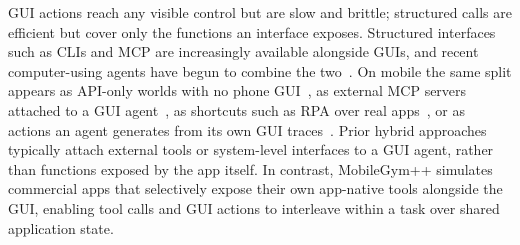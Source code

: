 GUI actions reach any visible control but are slow and brittle; structured calls are efficient but cover only the functions an interface exposes.
Structured interfaces such as CLIs and MCP are increasingly available alongside GUIs, and recent computer-using agents have begun to combine the two~\citep{hu2026toolcua, yan2025mcpworld, jia2026osworld, fan2026screenshots}.
On mobile the same split appears as API-only worlds with no phone GUI~\citep{trivedi2024appworld}, as external MCP servers attached to a GUI agent~\citep{kong2026mobileworld}, as shortcuts such as RPA over real apps~\citep{zhao2026mas}, or as actions an agent generates from its own GUI traces~\citep{lee2026improving}.
Prior hybrid approaches typically attach external tools or system-level interfaces to a GUI agent, rather than functions exposed by the app itself. In contrast, MobileGym++ simulates commercial apps that selectively expose their own app-native tools alongside the GUI, enabling tool calls and GUI actions to interleave within a task over shared application state.

